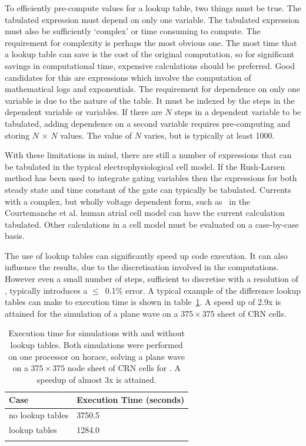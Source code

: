 To efficiently pre-compute values for a lookup table, two things must be true.
The tabulated expression must depend on only one variable.
The tabulated expression must also be sufficiently `complex' or time consuming
to compute.
The requirement for complexity is perhaps the most obvious one.
The most time that a lookup table can save is the cost of the original
computation, so for significant savings in computational time, expensive
calculations should be preferred.
Good candidates for this are expressions which involve the computation of
mathematical logs and exponentials.
The requirement for dependence on only one variable is due to the nature of the
table.
It must be indexed by the steps in the dependent variable or variables.
If there are $N$ steps in a dependent variable to be tabulated, adding
dependence on a second variable requires pre-computing and storing
$N\,\times\,N$ values.
The value of $N$ varies, but is typically at least 1000.

With these limitations in mind, there are still a number of expressions that can
be tabulated in the typical electrophysiological cell model.
If the Rush-Larsen method has been used to integrate gating variables then the
expressions for both steady state and time constant of the gate can typically be
tabulated.
Currents with a complex, but wholly voltage dependent form, such as \ in
the Courtemanche et al. human atrial cell model can have the current calculation
tabulated.
Other calculations in a cell model must be evaluated on a case-by-case basis.

The use of lookup tables can significantly speed up code execution.
It can also influence the results, due to the discretisation involved in the
computations.
However even a small number of steps, sufficient to discretise with a
resolution of , typically introduces a $\leq$~0.1\% error.
A typical example of the difference lookup tables can make to execution time is
shown in table~\ref{tbl:toolkit:lookup}.
A speed up of 2.9x is attained for the simulation of a plane wave on a
$375\times375$ sheet of CRN cells.

\begin{table}
    \caption[Execution time with and without lookup tables]{
    Execution time for simulations with and without lookup tables.  Both
    simulations were performed on one processor on horace, solving a plane wave
    on a $375\times375$ node sheet of CRN cells for .
    A speedup of almost 3x is attained.
    }
    \begin{center}
    \begin{tabular}{ l l }
    \toprule
    Case & Execution Time (seconds) \\
    \midrule
    no lookup tables & 3750.5 \\
    lookup tables & 1284.0 \\
    \bottomrule
    \label{tbl:toolkit:lookup}
    \end{tabular}
    \end{center}
\end{table}

